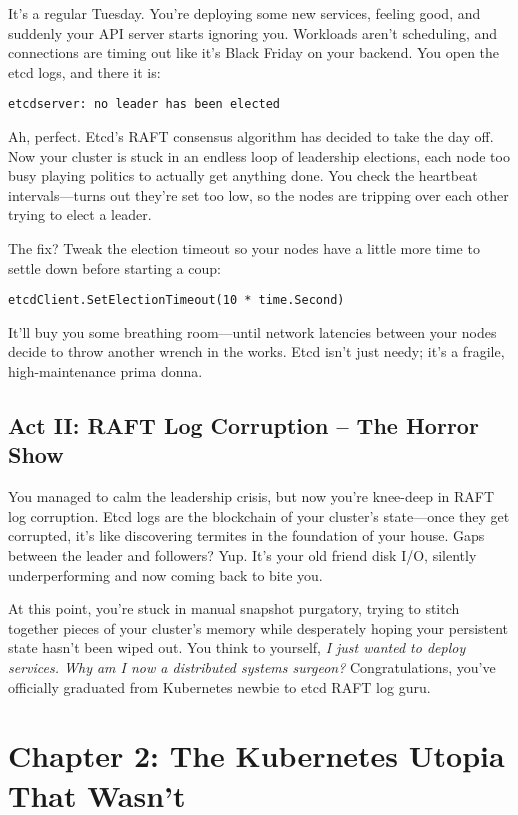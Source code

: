 \documentclass{article}
\begin{document}
It’s a regular Tuesday. You’re deploying some new services, feeling good, and suddenly your API server starts ignoring you. Workloads aren’t scheduling, and connections are timing out like it’s Black Friday on your backend. You open the etcd logs, and there it is:

\begin{lstlisting}
etcdserver: no leader has been elected
\end{lstlisting}

Ah, perfect. Etcd’s RAFT consensus algorithm has decided to take the day off. Now your cluster is stuck in an endless loop of leadership elections, each node too busy playing politics to actually get anything done. You check the heartbeat intervals—turns out they’re set too low, so the nodes are tripping over each other trying to elect a leader.

The fix? Tweak the election timeout so your nodes have a little more time to settle down before starting a coup:

\begin{lstlisting}
etcdClient.SetElectionTimeout(10 * time.Second)
\end{lstlisting}

It’ll buy you some breathing room—until network latencies between your nodes decide to throw another wrench in the works. Etcd isn’t just needy; it’s a fragile, high-maintenance prima donna.

\subsection{Act II: RAFT Log Corruption – The Horror Show}

You managed to calm the leadership crisis, but now you’re knee-deep in RAFT log corruption. Etcd logs are the blockchain of your cluster’s state—once they get corrupted, it’s like discovering termites in the foundation of your house. Gaps between the leader and followers? Yup. It’s your old friend disk I/O, silently underperforming and now coming back to bite you.

At this point, you’re stuck in manual snapshot purgatory, trying to stitch together pieces of your cluster’s memory while desperately hoping your persistent state hasn’t been wiped out. You think to yourself, \textit{I just wanted to deploy services. Why am I now a distributed systems surgeon?} Congratulations, you’ve officially graduated from Kubernetes newbie to etcd RAFT log guru.

\section{Chapter 2: The Kubernetes Utopia That Wasn’t}
\end{document}
